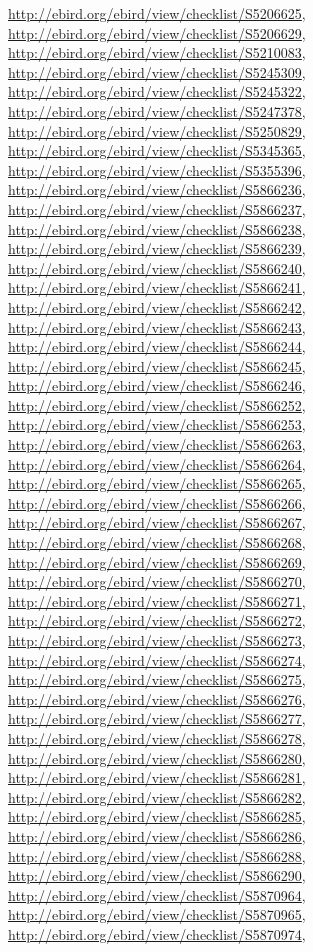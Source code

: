 \documentclass[9pt, article]{memoir}
\begin{document}
\begin{multicols}{2}
\url{http://ebird.org/ebird/view/checklist/S5206625}, 
\url{http://ebird.org/ebird/view/checklist/S5206629}, 
\url{http://ebird.org/ebird/view/checklist/S5210083}, 
\url{http://ebird.org/ebird/view/checklist/S5245309}, 
\url{http://ebird.org/ebird/view/checklist/S5245322}, 
\url{http://ebird.org/ebird/view/checklist/S5247378}, 
\url{http://ebird.org/ebird/view/checklist/S5250829}, 
\url{http://ebird.org/ebird/view/checklist/S5345365}, 
\url{http://ebird.org/ebird/view/checklist/S5355396}, 
\url{http://ebird.org/ebird/view/checklist/S5866236}, 
\url{http://ebird.org/ebird/view/checklist/S5866237}, 
\url{http://ebird.org/ebird/view/checklist/S5866238}, 
\url{http://ebird.org/ebird/view/checklist/S5866239}, 
\url{http://ebird.org/ebird/view/checklist/S5866240}, 
\url{http://ebird.org/ebird/view/checklist/S5866241}, 
\url{http://ebird.org/ebird/view/checklist/S5866242}, 
\url{http://ebird.org/ebird/view/checklist/S5866243}, 
\url{http://ebird.org/ebird/view/checklist/S5866244}, 
\url{http://ebird.org/ebird/view/checklist/S5866245}, 
\url{http://ebird.org/ebird/view/checklist/S5866246}, 
\url{http://ebird.org/ebird/view/checklist/S5866252}, 
\url{http://ebird.org/ebird/view/checklist/S5866253}, 
\url{http://ebird.org/ebird/view/checklist/S5866263}, 
\url{http://ebird.org/ebird/view/checklist/S5866264}, 
\url{http://ebird.org/ebird/view/checklist/S5866265}, 
\url{http://ebird.org/ebird/view/checklist/S5866266}, 
\url{http://ebird.org/ebird/view/checklist/S5866267}, 
\url{http://ebird.org/ebird/view/checklist/S5866268}, 
\url{http://ebird.org/ebird/view/checklist/S5866269}, 
\url{http://ebird.org/ebird/view/checklist/S5866270}, 
\url{http://ebird.org/ebird/view/checklist/S5866271}, 
\url{http://ebird.org/ebird/view/checklist/S5866272}, 
\url{http://ebird.org/ebird/view/checklist/S5866273}, 
\url{http://ebird.org/ebird/view/checklist/S5866274}, 
\url{http://ebird.org/ebird/view/checklist/S5866275}, 
\url{http://ebird.org/ebird/view/checklist/S5866276}, 
\url{http://ebird.org/ebird/view/checklist/S5866277}, 
\url{http://ebird.org/ebird/view/checklist/S5866278}, 
\url{http://ebird.org/ebird/view/checklist/S5866280}, 
\url{http://ebird.org/ebird/view/checklist/S5866281}, 
\url{http://ebird.org/ebird/view/checklist/S5866282}, 
\url{http://ebird.org/ebird/view/checklist/S5866285}, 
\url{http://ebird.org/ebird/view/checklist/S5866286}, 
\url{http://ebird.org/ebird/view/checklist/S5866288}, 
\url{http://ebird.org/ebird/view/checklist/S5866290}, 
\url{http://ebird.org/ebird/view/checklist/S5870964}, 
\url{http://ebird.org/ebird/view/checklist/S5870965}, 
\url{http://ebird.org/ebird/view/checklist/S5870974}, 

\end{multicols}
\end{document}
